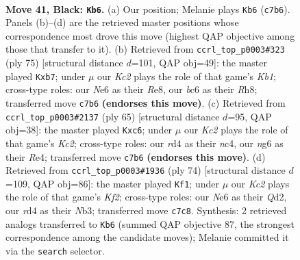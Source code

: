 \documentclass[11pt]{article}
\begin{document}
\clearpage

\begin{figure}[p]\centering
\begin{subfigure}{0.46\textwidth}\centering
\resizebox{\linewidth}{!}{%
\newchessgame
\chessboard[
  setfen={r7/1pk1Q1p1/p1B1npN1/8/3R3p/4P1P1/PPR2P1P/7K b - - 2 41},
  showmover=false,
  pgfstyle=straightmove, color=movearrow, markmove={c7-b6}
]}
\caption{}
\end{subfigure}\hfill
\begin{subfigure}{0.46\textwidth}\centering
\resizebox{\linewidth}{!}{%
\newchessgame
\chessboard[
  setfen={1k2r2r/pQ3p2/1p2p2P/3pP1P1/1R2nP2/2p1B2R/2P3K1/8 b - - 0 38},
  showmover=false,
  pgfstyle=straightmove, color=movearrow, markmove={b8-b7}
]}
\caption{}
\end{subfigure}
\\[4pt]
\begin{subfigure}{0.46\textwidth}\centering
\resizebox{\linewidth}{!}{%
\newchessgame
\chessboard[
  setfen={8/2kn4/2Q2p2/p1p5/1pN1r3/2P3P1/5P1P/2R3K1 b - - 0 33},
  showmover=false,
  pgfstyle=straightmove, color=movearrow, markmove={c7-c6}
]}
\caption{}
\end{subfigure}\hfill
\begin{subfigure}{0.46\textwidth}\centering
\resizebox{\linewidth}{!}{%
\newchessgame
\chessboard[
  setfen={4r1k1/5pn1/4bBp1/p3P2p/P1P3P1/1NR4P/3Q1K1q/8 w - - 4 38},
  showmover=false,
  pgfstyle=straightmove, color=movearrow, markmove={f2-f1}
]}
\caption{}
\end{subfigure}
\caption{\textbf{Move 41, Black: \texttt{Kb6}.} (a) Our position; Melanie plays \texttt{Kb6} (\texttt{c7b6}). Panels (b)--(d) are the retrieved master positions whose correspondence most drove this move (highest QAP objective among those that transfer to it). (b) Retrieved from \texttt{ccrl\_top\_p0003\#323} (ply 75) [structural distance $d$=101, QAP obj=49]: the master played \texttt{Kxb7}; under $\mu$ our \emph{Kc2} plays the role of that game's \emph{Kb1}; cross-type roles: our \emph{N}e6 as their \emph{R}e8, our \emph{b}c6 as their \emph{R}h8; transferred move \texttt{c7b6} \textbf{(endorses this move)}. (c) Retrieved from \texttt{ccrl\_top\_p0003\#2137} (ply 65) [structural distance $d$=95, QAP obj=38]: the master played \texttt{Kxc6}; under $\mu$ our \emph{Kc2} plays the role of that game's \emph{Kc2}; cross-type roles: our \emph{r}d4 as their \emph{n}c4, our \emph{n}g6 as their \emph{R}e4; transferred move \texttt{c7b6} \textbf{(endorses this move)}. (d) Retrieved from \texttt{ccrl\_top\_p0003\#1936} (ply 74) [structural distance $d$=109, QAP obj=86]: the master played \texttt{Kf1}; under $\mu$ our \emph{Kc2} plays the role of that game's \emph{Kf2}; cross-type roles: our \emph{N}e6 as their \emph{Q}d2, our \emph{r}d4 as their \emph{N}b3; transferred move \texttt{c7c8}. Synthesis: 2 retrieved analogs transferred to \texttt{Kb6} (summed QAP objective 87, the strongest correspondence among the candidate moves); Melanie committed it via the \texttt{search} selector.}
\label{fig:thought-m81}
\end{figure}
\end{document}
